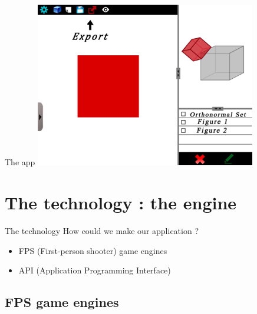 \documentclass[a4paper,10pt]{beamer}
\begin{document}
			\begin{frame}{The app}
				\includegraphics[height=205pt]{maquette/maquette_8.png}
			\end{frame}
			
		
		
	\section{The technology : the engine}
			
			\begin{frame}{The technology}
				How could we make our application ?
				\begin{itemize}
					\item FPS (First-person shooter) game engines
					\item API (Application Programming Interface)

				\end{itemize}
			\end{frame}
			
		\subsection{FPS game engines}
		
\end{document}
